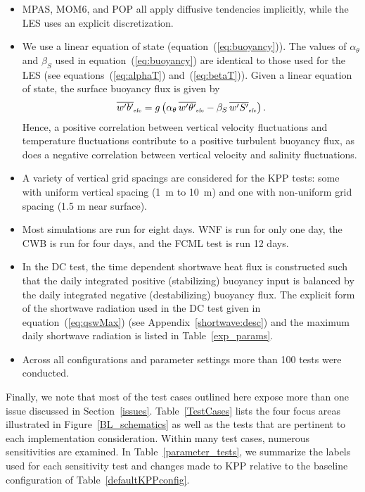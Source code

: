 \documentclass[preprint,12pt,authoryear]{agujournal}
\begin{document}
\begin{itemize}
\item MPAS, MOM6, and POP all apply diffusive tendencies implicitly, while the LES uses an explicit discretization.
\item We use a linear equation of state (equation~(\ref{eq:buoyancy})). The values of $\alpha_{\theta}$ and $\beta_S$ used in equation~(\ref{eq:buoyancy}) are identical to those used for the LES (see equations~(\ref{eq:alphaT}) and~(\ref{eq:betaT})).  Given a linear equation of state, the surface buoyancy flux is given by  
\begin{equation}
\label{eq:wbSFC}
 \overline{w^\prime b^\prime}_{\mbox{\tiny sfc}} = 
 g 
 \left(
 \alpha_{\theta} \, 
 \overline{w^\prime \theta^\prime}_{\mbox{\tiny sfc}} 
 -\beta_S \, 
 \overline{w^\prime S^\prime}_{\mbox{\tiny sfc}}
 \right).
 \end{equation}
 Hence, a positive correlation between vertical velocity fluctuations and temperature fluctuations contribute to a positive turbulent buoyancy flux, as does a negative correlation between vertical velocity and salinity fluctuations. 

\item A variety of vertical grid spacings are considered for the KPP tests: some with uniform vertical spacing (1~m to 10~m) and one with non-uniform grid spacing (1.5 m near surface).  

\item Most simulations are run for eight days.  WNF is run for only one day, the CWB is run for four days, and the FCML test is run 12 days.

\item In the DC test, the time dependent shortwave heat flux is constructed such that the daily integrated positive (stabilizing) buoyancy input is balanced by the daily integrated negative (destabilizing) buoyancy flux.  The explicit form of the shortwave radiation used in the DC test given in equation~(\ref{eq:qswMax}) (see Appendix~\ref{shortwave:desc}) and the maximum daily shortwave radiation is listed in Table~\ref{exp_params}. 

\item Across all configurations and parameter settings more than 100 tests were conducted.

\end{itemize}
Finally, we note that most of the test cases outlined here expose more than one issue discussed in Section~\ref{issues}.  Table~\ref{TestCases} lists the four focus areas illustrated in  Figure~\ref{BL_schematics} as well as the tests that are pertinent to each implementation consideration.  Within many test cases, numerous sensitivities are examined. In Table~\ref{parameter_tests}, we summarize the labels used for each sensitivity test and changes made to KPP relative to the baseline configuration of Table~\ref{defaultKPPconfig}.
\end{document}
